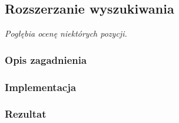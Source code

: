 \subsection{Rozszerzanie wyszukiwania}
\label{subsec:rozszerzanie-wyszukiwania}
\textit{Pogłębia ocenę niektórych pozycji.}


\subsubsection{Opis zagadnienia}
\subsubsection{Implementacja}
\subsubsection{Rezultat}